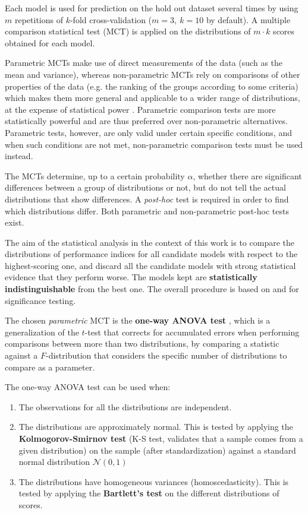 Each model is used for prediction on the hold out dataset several times by using $m$ repetitions of
$k$-fold cross-validation ($m=3,~k=10$ by default). A multiple comparison statistical test (MCT) is
applied on the distributions of $m\cdot k$ scores obtained for each model.

Parametric MCTs make use of direct measurements of the data (such as the mean and variance), whereas
non-parametric MCTs rely on comparisons of other properties of the data (e.g. the ranking of the
groups according to some criteria) which makes them more general and applicable to a wider range of
distributions, at the expense of statistical power \cite{sheskin2003statistics}. Parametric
comparison tests are more statistically powerful and are thus preferred over non-parametric
alternatives.  Parametric tests, however, are only valid under certain specific conditions, and when
such conditions are not met, non-parametric comparison tests must be used instead.

The MCTs determine, up to a certain probability $\alpha$, whether there are significant differences between a
group of distributions or not, but do not tell the actual distributions that show differences. A
\emph{post-hoc} test is required in order to find which distributions differ. Both parametric and
non-parametric post-hoc tests exist.

The aim of the statistical analysis in the context of this work is to compare the distributions of
performance indices for all candidate models with respect to the highest-scoring one, and discard
all the candidate models with strong statistical evidence that they perform worse. The models kept
are {\bf statistically indistinguishable} from the best one. The overall procedure is based on
\cite{pizarro2002mct} and \cite{demsar2006mct} for significance testing.

The chosen \emph{parametric} MCT is the {\bf one-way ANOVA test} \cite{fisher1925statistical}, which is a
generalization of the $t$-test that corrects for accumulated errors when performing comparisons
between more than two distributions, by comparing a statistic against a $F$-distribution that
considers the specific number of distributions to compare as a parameter.

The one-way ANOVA test can be used when:
\begin{enumerate}
	\item The observations for all the distributions are independent.
	\item The distributions are approximately normal. This is tested by applying the
	{\bf Kolmogorov-Smirnov test} (K-S test, validates that a sample comes from a given distribution) on
	the sample (after standardization) against a standard normal distribution $\mathcal{N}(0,1)$
	\item The distributions have homogeneous variances (homoscedasticity). This is tested by
	applying the {\bf Bartlett's test} \cite{bartlett1937} on the different distributions of scores.
\end{enumerate}

